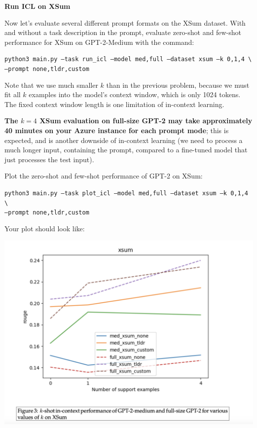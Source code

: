 \item {} {\bf Run ICL on XSum}

Now let's evaluate several different prompt formats on the XSum dataset. With and without a task description in the prompt, evaluate zero-shot and few-shot performance for XSum on GPT-2-Medium with the command:

\texttt{\small python3 main.py --task run\_icl --model med,full --dataset xsum --k 0,1,4 \textbackslash \\
\phantom{asdf}--prompt none,tldr,custom}

Note that we use much smaller $k$ than in the previous problem, because we must fit all $k$ examples into the model's context window, which is only 1024 tokens. The fixed context window length is one limitation of in-context learning.

\textbf{The $k=4$ XSum evaluation on full-size GPT-2 may take approximately 40 minutes on your Azure instance for each prompt mode}; this is expected, and is another downside of in-context learning (we need to process a much longer input, containing the prompt, compared to a fine-tuned model that just processes the test input).

Plot the zero-shot and few-shot performance of GPT-2 on XSum:

\texttt{\small python3 main.py --task plot\_icl --model med,full --dataset xsum --k 0,1,4 \textbackslash \\
\phantom{asdf}--prompt none,tldr,custom}

Your plot should look like:
\begin{center}
    \includegraphics[width=0.75\linewidth]{./figures/incontext-2c}
\end{center}

